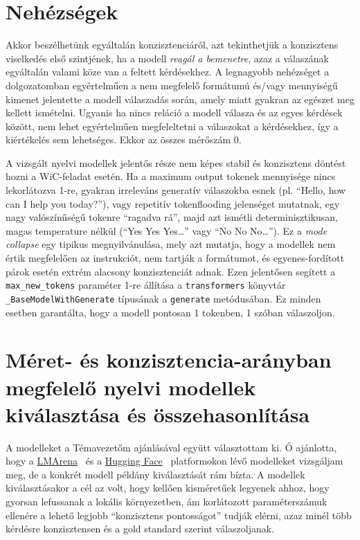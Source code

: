 \documentclass[12pt]{report}
\begin{document}
    \section{Nehézségek}
    Akkor beszélhetünk egyáltalán konzisztenciáról, azt tekinthetjük a konzisztens viselkedés első szintjének, ha a modell \textit{reagál a bemenetre}, azaz a válaszának egyáltalán valami köze van a feltett kérdésekhez.
    A legnagyobb nehézséget a dolgozatomban egyértelműen a nem megfelelő formátumú és/vagy mennyiségű kimenet jelentette a modell válaszadás során, amely miatt gyakran az egészet meg kellett ismételni.
    Ugyanis ha nincs reláció a modell válasza és az egyes kérdések között, nem lehet egyértelműen megfeleltetni a válaszokat a kérdésekhez, így a kiértékelés sem lehetséges.
    Ekkor az összes mérőszám 0.


    A vizsgált nyelvi modellek jelentős része nem képes stabil és konzisztens döntést hozni a WiC-feladat esetén.
    Ha a maximum output tokenek mennyisége nincs lekorlátozva 1-re, gyakran irreleváns generatív válaszokba esnek (pl.
    “Hello, how can I help you today?”), vagy repetitív tokenflooding jelenséget mutatnak, egy nagy valószínűségű tokenre “ragadva rá”, majd azt ismétli determinisztikusan, magas temperature nélkül (“Yes Yes Yes…” vagy “No No No…”).
    Ez a \textit{mode collapse} egy tipikus megnyilvánulása, mely azt mutatja, hogy a modellek nem értik megfelelően az instrukciót, nem tartják a formátumot, és egyenes-fordított párok esetén extrém alacsony konzisztenciát adnak. Ezen jelentősen segített a \texttt{\allowbreak max\_new\_tokens} paraméter 1-re állítása a \texttt{\allowbreak transformers} könyvtár \texttt{\allowbreak \_BaseModelWithGenerate} típusának a \texttt{\allowbreak generate} metódusában.
    Ez minden esetben garantálta, hogy a modell pontosan 1 tokenben, 1 szóban válaszoljon.


    \section{Méret- és konzisztencia-arányban megfelelő nyelvi modellek kiválasztása és összehasonlítása}
    A modelleket a Témavezetőm ajánlásával együtt választottam ki.
    Ő ajánlotta, hogy a \href{https://lmarena.ai/}{LMArena}~\cite{chiang2024chatbot} és a \href{https://huggingface.co}{Hugging Face}~\cite{wolf2019huggingface}  platformokon lévő modelleket vizsgáljam meg, de a konkrét modell példány kiválasztását rám bízta.
    A modellek kiválasztásakor a cél az volt, hogy kellően kisméretűek legyenek ahhoz, hogy gyorsan lefussanak a lokális környezetben, ám korlátozott paraméterszámuk ellenére a lehető legjobb ``konzisztens pontosságot'' tudják elérni, azaz minél több kérdésre konzisztensen és a gold standard szerint válaszoljanak.
\end{document}
